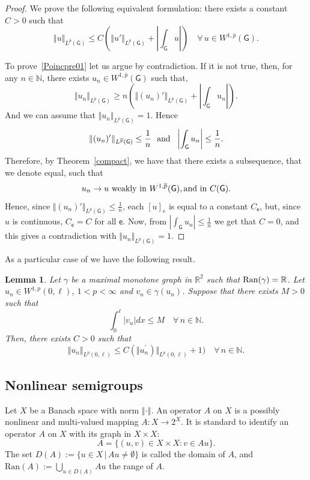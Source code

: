 \documentclass[reqno,12pt]{amsart}
\newtheorem{lemma}[theorem]{Lemma} %
\def\R{\mathbb R} %
\def\N{\mathbb N} %
\newcommand{\norm}[1]{\left\Vert #1 \right\Vert} %
\def\e{\mathsf{e}} 	%
\newcommand{\G}{\mathsf{G}}	%
\numberwithin{equation}{section} %
\begin{document}
\begin{proof}
We prove the following equivalent formulation:  there exists a constant $C>0$ such that
\begin{equation}\label{Poincpre01}
\Vert u \Vert_{L^{\overline{p}}(\G)} \leq C\left(\Vert u' \Vert_{L^{\overline{p}}(\G)} +\left|\int_\G u\right|\right) 
\quad \forall \, u \in  W^{1,\overline{p}}(\G).
\end{equation}

To prove~\eqref{Poincpre01}  let us argue by contradiction. If it  is not true, then, for any $n\in \mathbb{N}$, there exists $u_n\in W^{1,\overline{p}}(\G)$ such that,
\begin{equation}\label{Poincpre01neg}
\Vert u_n \Vert_{L^{\overline{p}}(\G)} \geq n\left(\Vert (u_n)' \Vert_{L^{\overline{p}}(\G)} +\left|\int_\G u_n\right|\right).
\end{equation}
And we can assume that $\Vert u_n \Vert_{L^{\overline{p}}(\G)}=1$. Hence
$$\Vert (u_n)' \Vert_{L^{\overline{p}}(\G)}\le\frac{1}{n}\ \hbox{ and }\   \left|\int_\G u_n\right|\le\frac{1}{n}.$$ 
Therefore, by Theorem~\ref{compact}, we have that there exists a subsequence, that we denote equal, such that
$$u_n\to u \hbox{ weakly in }  W^{1,\overline{p}}(\G),   \hbox{and in } C(\G).$$
Hence, since  $\Vert (u_n)' \Vert_{L^{\overline{p}}(\G)}\le\frac{1}{n}$, each $[u]_e$ is equal to a constant $C_\e$, but,  since $u $ is continuous,  $C_\e=C$ for all $\e$. Now, from $\displaystyle\left|\int_\G u_n\right|\le\frac{1}{n}$ we get that $C=0$, and this gives a contradiction with  $\Vert u_n \Vert_{L^{\overline{p}}(\G)}=1$.
\end{proof}
   As a particular case of \cite[Lemma 4.2]{AndIgMazTo06}  we have the following result.  

 \begin{lemma}\label{Poinc} Let $\gamma$ be a maximal monotone graph in $\R^2$ such that ${\rm Ran}(\gamma) = \R$. Let $u_n \in W^{1,p}(0,\ell)$, $1 < p < \infty$ and $v_n \in \gamma(u_n)$. Suppose that  there exists $M>0$ such that
 $$\int_0^{\ell} \vert v_n \vert dx \leq M \quad \forall \, n \in \N.$$
 Then, there exists $C >0$ such that
 $$\Vert u_n \Vert_{L^p(0,\ell)} \leq C( \Vert u^{\prime}_n )\Vert_{L^p(0,\ell)} +1)  \quad \forall \, n \in \N.$$
\end{lemma}
  
 
\subsection{Nonlinear semigroups}
\label{sec:semigroups}
Let $X$ be  a Banach space with norm $\norm{\cdot}$.
An operator $A$ on $X$ is a possibly nonlinear
and multi-valued mapping $A : X\to 2^{X}$. It is standard to identify
an operator $A$ on $X$ with its graph in $X \times X$:
\begin{displaymath}
  A=\Big\{(u,v)\in X\times X: v\in Au\Big\}.
\end{displaymath} 
The set
$D(A):=\{u\in X\,\vert\,Au\neq \emptyset\}$ is called the
 domain  of $A$, and
$\textrm{Ran}(A):=\bigcup_{u\in D(A)}Au$ the  range 
of $A$. 
\end{document}
